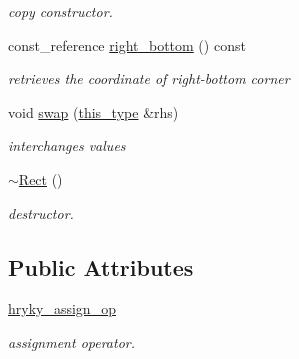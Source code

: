 \begin{DoxyCompactItemize}
\begin{DoxyCompactList}\small\item\em copy constructor. \end{DoxyCompactList}\item 
\hypertarget{classhryky_1_1geometry_1_1_rect_a28bb3b1a495b06aad499d7a5384b1a9c}{const\-\_\-reference \hyperlink{classhryky_1_1geometry_1_1_rect_a28bb3b1a495b06aad499d7a5384b1a9c}{right\-\_\-bottom} () const }\label{classhryky_1_1geometry_1_1_rect_a28bb3b1a495b06aad499d7a5384b1a9c}

\begin{DoxyCompactList}\small\item\em retrieves the coordinate of right-\/bottom corner \end{DoxyCompactList}\item 
\hypertarget{classhryky_1_1geometry_1_1_rect_a0d7220afb7ed9c0cd1f5d2575205e027}{void \hyperlink{classhryky_1_1geometry_1_1_rect_a0d7220afb7ed9c0cd1f5d2575205e027}{swap} (\hyperlink{classhryky_1_1geometry_1_1_rect_a0e04e42565acd9601e538620a8cff1b2}{this\-\_\-type} \&rhs)}\label{classhryky_1_1geometry_1_1_rect_a0d7220afb7ed9c0cd1f5d2575205e027}

\begin{DoxyCompactList}\small\item\em interchanges values \end{DoxyCompactList}\item 
\hypertarget{classhryky_1_1geometry_1_1_rect_ab3f2ba136f3b39136ffa9ecb23bbadc6}{\hyperlink{classhryky_1_1geometry_1_1_rect_ab3f2ba136f3b39136ffa9ecb23bbadc6}{$\sim$\-Rect} ()}\label{classhryky_1_1geometry_1_1_rect_ab3f2ba136f3b39136ffa9ecb23bbadc6}

\begin{DoxyCompactList}\small\item\em destructor. \end{DoxyCompactList}\end{DoxyCompactItemize}
\subsection*{Public Attributes}
\begin{DoxyCompactItemize}
\item 
\hypertarget{classhryky_1_1geometry_1_1_rect_afb4184b56f32f3c7843da3ec6d8e2d47}{\hyperlink{classhryky_1_1geometry_1_1_rect_afb4184b56f32f3c7843da3ec6d8e2d47}{hryky\-\_\-assign\-\_\-op}}\label{classhryky_1_1geometry_1_1_rect_afb4184b56f32f3c7843da3ec6d8e2d47}

\begin{DoxyCompactList}\small\item\em assignment operator. \end{DoxyCompactList}\end{DoxyCompactItemize}


